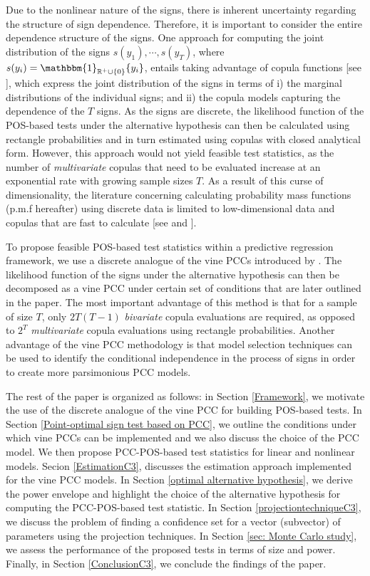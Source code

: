 \documentclass[harvard,11pt]{article}
\newcommand{\R}{\mathbb{R}}
\begin{document}
Due to the nonlinear nature of the signs, there is inherent uncertainty regarding the structure of sign dependence. Therefore, it is important to consider the entire dependence structure of the signs. One approach for computing the joint distribution of the signs $s(y_1),\cdots,s(y_T)$, where $s(y_i)=\mathbbm{1}_{\R^+ \cup\{0\} }\{y_i\}$, entails taking advantage of copula functions [see \citet{sklar1959fonctions}], which express the joint distribution of the signs in terms of i) the marginal distributions of the individual signs; and ii) the copula models capturing the dependence of the $T$ signs. As the signs are discrete, the likelihood function of the POS-based tests under the alternative hypothesis can then be calculated using rectangle probabilities and in turn estimated using copulas with closed analytical form. However, this approach would not yield feasible test statistics, as the number of \textit{multivariate} copulas that need to be evaluated increase at an exponential rate with growing sample sizes $T$. As a result of this curse of dimensionality, the literature concerning calculating probability mass functions (p.m.f hereafter) using discrete data is limited to low-dimensional data and copulas that are fast to calculate [see \citet{nikoloulopoulos2008multivariate,nikoloulopoulos2009finite} and \citet{li2010two}]. 

To propose feasible POS-based test statistics within a predictive regression framework, we use a discrete analogue of the vine PCCs introduced by \citet{panagiotelis2012pair}. The likelihood function of the signs under the alternative hypothesis can then be decomposed as a vine PCC under certain set of conditions that are later outlined in the paper. The most important advantage of this method is that for a sample of size $T$, only $2T(T-1)$ \textit{bivariate} copula evaluations are required, as opposed to $2^T$ \textit{multivariate} copula evaluations using rectangle probabilities. Another advantage of the vine PCC methodology is that model selection techniques can be used to identify the conditional independence in the process of signs in order to create more parsimonious PCC models. 


The rest of the paper is organized as follows: in Section \ref{Framework}, we motivate the use of the discrete analogue of the vine PCC for building POS-based tests. In Section \ref{Point-optimal sign
test based on PCC}, we outline the conditions under which vine PCCs can be implemented and we also discuss the choice of the PCC model. We then propose PCC-POS-based test statistics for linear and nonlinear models. Secion \ref{EstimationC3}, discusses the estimation approach implemented for the vine PCC models. In Section \ref{optimal alternative hypothesis}, we derive the power envelope and highlight the choice of the alternative hypothesis for computing the PCC-POS-based test statistic. In Section \ref{projectiontechniqueC3}, we discuss the problem of finding a confidence set for a vector (subvector) of parameters using the projection techniques. In Section \ref{sec: Monte Carlo study}, we assess the performance of the proposed tests in terms of size and power. Finally, in Section \ref{ConclusionC3}, we conclude the findings of the paper.
\end{document}
